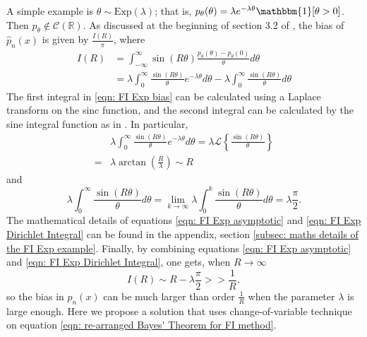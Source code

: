 \documentclass[%
 reprint,
 amsmath,amssymb,
 aps,
]{revtex4-2}
\def\R{\mathbb{R}}
\begin{document}
A simple example is $\theta \sim \text{Exp}(\lambda)$; that is, $p_\theta(\theta) = \lambda e^{-\lambda \theta} \mathbbm{1}[\theta > 0]$. Then $p_\theta \notin \mathcal{C}(\R)$. As discussed at the beginning of section 3.2 of \cite{rotiroti2022computing}, the bias of $\hat{p}_n(x)$ is given by $\displaystyle \frac{I(R)}{\pi}$, where
\begin{align} \label{eqn: FI Exp bias}
    I(R) & = \int_{-\infty}^\infty \sin(R\theta) \frac{p_\theta(\theta) - p_\theta(0)}{\theta} d\theta \\
    & = \lambda \int_0^\infty \frac{\sin(R\theta)}{\theta} e^{-\lambda \theta} d\theta - \lambda \int_0^\infty \frac{\sin(R\theta)}{\theta} d\theta
\end{align}
The first integral in \eqref{eqn: FI Exp bias} can be calculated using a Laplace transform on the sinc function, and the second integral can be calculated by the sine integral function as in \cite{rotiroti2022computing}. In particular,
\begin{align} \label{eqn: FI Exp asymptotic}
    & \lambda \int_0^\infty \frac{\sin(R\theta)}{\theta} e^{-\lambda \theta} d\theta = \lambda \mathcal{L}\left\{\frac{\sin(R\theta)}{\theta} \right\} \\
    = & \lambda \arctan\left(\frac{R}{\lambda}\right) \sim R
\end{align}
and
\begin{equation} \label{eqn: FI Exp Dirichlet Integral}
    \lambda \int_0^\infty \frac{\sin(R\theta)}{\theta} d\theta = \lim_{k \to \infty} \lambda \int_0^k \frac{\sin(R\theta)}{\theta} d\theta = \lambda\frac{\pi}{2}.
\end{equation}
The mathematical details of equations \eqref{eqn: FI Exp asymptotic} and \eqref{eqn: FI Exp Dirichlet Integral} can be found in the appendix, section \ref{subsec: maths details of the FI Exp example}. Finally, by combining equations \eqref{eqn: FI Exp asymptotic} and \eqref{eqn: FI Exp Dirichlet Integral}, one gets, when $R \to \infty$
\begin{equation} \label{eqn: FI Exp bias I component}
    I(R) \sim R - \lambda \frac{\pi}{2} >> \frac{1}{R},
\end{equation}
so the bias in $\hat{p}_n(x)$ can be much larger than order $\frac{1}{R}$ when the parameter $\lambda$ is large enough. Here we propose a solution that uses change-of-variable technique on equation \eqref{eqn: re-arranged Bayes' Theorem for FI method}.
\end{document}
